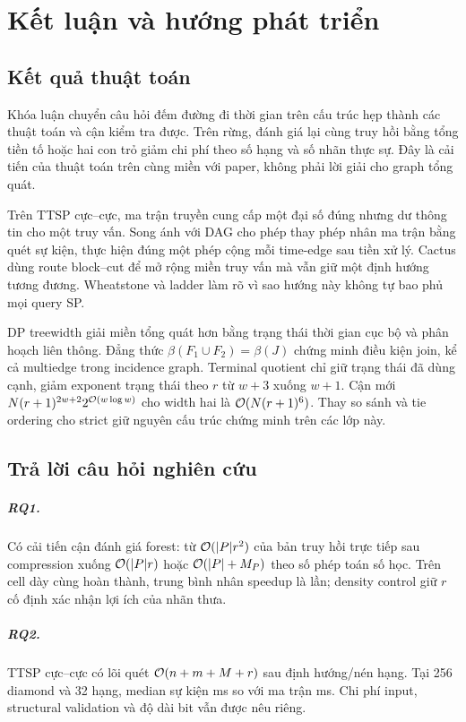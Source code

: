 \chapter{Kết luận và hướng phát triển}
\label{chap:conclusion}

\section{Kết quả thuật toán}

Khóa luận chuyển câu hỏi đếm đường đi thời gian trên cấu trúc hẹp thành các thuật toán và cận kiểm tra được. Trên rừng, đánh giá lại cùng truy hồi bằng tổng tiền tố hoặc hai con trỏ giảm chi phí theo số hạng và số nhãn thực sự. Đây là cải tiến của thuật toán trên cùng miền với paper, không phải lời giải cho graph tổng quát.

Trên TTSP cực--cực, ma trận truyền cung cấp một đại số đúng nhưng dư thông tin cho một truy vấn. Song ánh với DAG cho phép thay phép nhân ma trận bằng quét sự kiện, thực hiện đúng một phép cộng mỗi time-edge sau tiền xử lý. Cactus dùng route block--cut để mở rộng miền truy vấn mà vẫn giữ một định hướng tương đương. Wheatstone và ladder làm rõ vì sao hướng này không tự bao phủ mọi query SP.

DP treewidth giải miền tổng quát hơn bằng trạng thái thời gian cục bộ và phân hoạch liên thông. Đẳng thức $\beta(F_1\cup F_2)=\beta(J)$ chứng minh điều kiện join, kể cả multiedge trong incidence graph. Terminal quotient chỉ giữ trạng thái đã dùng cạnh, giảm exponent trạng thái theo $r$ từ $w+3$ xuống $w+1$. Cận mới $N(r+1)^{2w+2}2^{\mathcal{O}(w\log w)}$ cho width hai là $\mathcal{O}(N(r+1)^6)$. Thay so sánh và tie ordering cho strict giữ nguyên cấu trúc chứng minh trên các lớp này.

\section{Trả lời câu hỏi nghiên cứu}

\paragraph{RQ1.} Có cải tiến cận đánh giá forest: từ $\mathcal{O}(|P|r^2)$ của bản truy hồi trực tiếp sau compression xuống $\mathcal{O}(|P|r)$ hoặc $\mathcal{O}(|P|+M_P)$ theo số phép toán số học. Trên \ForestPairedCells{} cell dày cùng hoàn thành, trung bình nhân speedup là \ForestGeoSpeedup{} lần; density control giữ $r$ cố định xác nhận lợi ích của nhãn thưa.

\paragraph{RQ2.} TTSP cực--cực có lõi quét $\mathcal{O}(n+m+M+r)$ sau định hướng/nén hạng. Tại 256 diamond và 32 hạng, median sự kiện \TTSPEventTime{} ms so với ma trận \TTSPMatrixTime{} ms. Chi phí input, structural validation và độ dài bit vẫn được nêu riêng.


